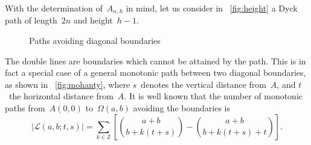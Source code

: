With the determination of~\(A_{n,h}\) in mind, let us consider in
\fig~\ref{fig:height} a Dyck path of length~\(2n\) and height~\(h-1\).
\begin{figure}[t]
\centering
{}
\quad
{}
\caption{Paths avoiding diagonal boundaries\label{fig:boundaries}}
\end{figure}
The double lines are boundaries which cannot be attained by the
path. This is in fact a special case of a general monotonic path
between two diagonal boundaries, as shown in \fig~\ref{fig:mohanty},
where \(s\)~denotes the vertical distance from~\(A\), and \(t\)~the
horizontal distance from~\(A\). It is well known that the number of
monotonic paths from~\(A(0,0)\) to~\(\Omega(a,b)\) avoiding the
boundaries is
\begin{equation}
\left\lvert\mathcal{L}(a,b;t,s)\right\rvert = \sum_{k \in \mathbb{Z}}\left[\binom{a+b}{b+k(t+s)} - \binom{a+b}{b+k(t+s)+t}\right].
\label{eq:mohanty}
\end{equation}

